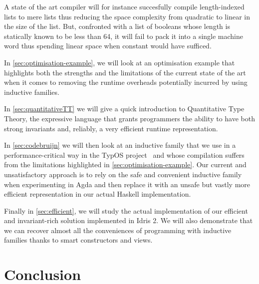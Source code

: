 \documentclass{article}
\newcommand{\typos}{TypOS}
\newcommand{\idris}{Idris 2}
\begin{document}
A state of the art compiler will for instance succesfully compile length-indexed
lists to mere lists thus reducing the space complexity from quadratic to linear
in the size of the list.
%
But, confronted with a list of booleans whose length is statically known to be
less than 64, it will fail to pack it into a single machine word thus spending
linear space when constant would have sufficed.

In \cref{sec:optimisation-example}, we will look at an optimisation example
that highlights both the strengths and the limitations of the current state
of the art when it comes to removing the runtime overheads potentially
incurred by using inductive families.

In \cref{sec:quantitativeTT} we will give a quick introduction to Quantitative
Type Theory, the expressive language that grants programmers the ability
to have both strong invariants and, reliably, a very efficient runtime
representation.

In \cref{sec:codebruijn} we will then look at an inductive family that we
use in a performance-critical way in the \typos{}
project~\cite{MANUAL:talk/types/Allais22}
and whose compilation suffers from the limitations highlighted in
\cref{sec:optimisation-example}.
%
Our current and unsatisfactory approach is to rely on the safe and convenient
inductive family when experimenting in Agda and then replace it with an unsafe
but vastly more efficient representation in our actual Haskell implementation.

Finally in \cref{sec:efficient}, we will study the actual implementation of
our efficient and invariant-rich solution implemented in \idris{}. We will
also demonstrate that we can recover almost all the conveniences of programming
with inductive families thanks to smart constructors and views.








\section{Conclusion}\label{sec:conclusion}
\end{document}
